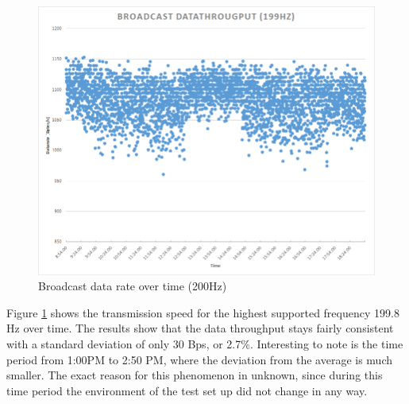 \begin{description}
	\begin{figure}[H]
		\centering
		\includegraphics[scale=0.5]{./pics/exp1_long.png}
		\caption{Broadcast data rate over time (200Hz)}\label{fig:exp1long}
	\end{figure}
	Figure \ref{fig:exp1long} shows the transmission speed for the highest supported frequency 199.8 Hz over time. The results show that the data throughput stays fairly consistent with a standard deviation of only 30 Bps, or 2.7\%. Interesting to note is the time period from 1:00PM to 2:50 PM, where the deviation from the average is much smaller. The exact reason for this phenomenon in unknown, since during this time period the environment of the test set up did not change in any way.
\end{description}
\newpage


